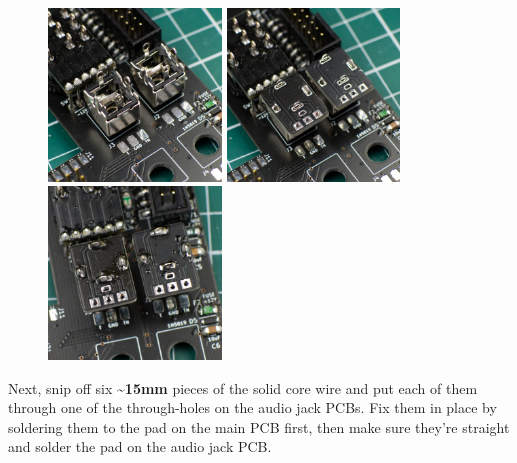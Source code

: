 \documentclass[12pt, a4paper]{article}
\begin{document}
\begin{figure}[H]
    \centering
    \includegraphics[width=46mm]{images/section_3-3_screwed.jpg}
    \hspace{2mm}
    \includegraphics[width=46mm]{images/section_3-3_pcb.jpg}
    \hspace{2mm}
    \includegraphics[width=46mm]{images/section_3-3_pcb_soldered.jpg}
\end{figure}

Next, snip off six \textbf{\textasciitilde15mm} pieces of the solid core wire and put each of them
through one of the through-holes on the audio jack PCBs. Fix them in place by soldering them to
the pad on the main PCB first, then make sure they're straight and solder the pad on the audio
jack PCB.
\end{document}
